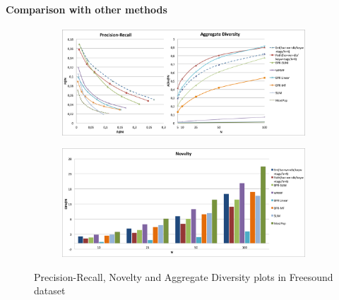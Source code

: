 \paragraph*{\textbf{Comparison with other methods}}\label{comp}
\begin{figure}
	\centering
	\begin{subfigure}[b]{0.5\textwidth}
		\includegraphics[width=\textwidth]{ch06_graph-rec/pics/pr_adiv_fr.png}
	\end{subfigure}
	\begin{subfigure}[b]{0.5\textwidth}
		\includegraphics[width=\textwidth]{ch06_graph-rec/pics/nov_fr.png}
	\end{subfigure}
	\caption{Precision-Recall, Novelty and Aggregate Diversity plots in Freesound dataset\label{fig:graph-rec:accur}}
\end{figure}

